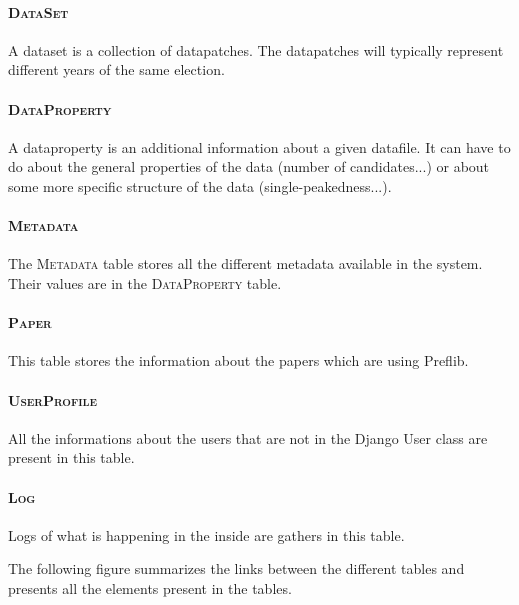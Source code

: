 \documentclass{report}
\begin{document}
	\paragraph{\textsc{DataSet}} A dataset is a collection of datapatches. The datapatches will typically represent different years of the same election.
	
	\paragraph{\textsc{DataProperty}} A dataproperty is an additional information about a given datafile. It can have to do about the general properties of the data (number of candidates...) or about some more specific structure of the data (single-peakedness...).
	
	\paragraph{\textsc{Metadata}} The \textsc{Metadata} table stores all the different metadata available in the system. Their values are in the \textsc{DataProperty} table.
	
	\paragraph{\textsc{Paper}} This table stores the information about the papers which are using Preflib.
	
	\paragraph{\textsc{UserProfile}} All the informations about the users that are not in the Django User class are present in this table.
	
	\paragraph{\textsc{Log}} Logs of what is happening in the inside are gathers in this table.
	
	\medskip
	
	The following figure summarizes the links between the different tables and presents all the elements present in the tables.
	
\end{document}

